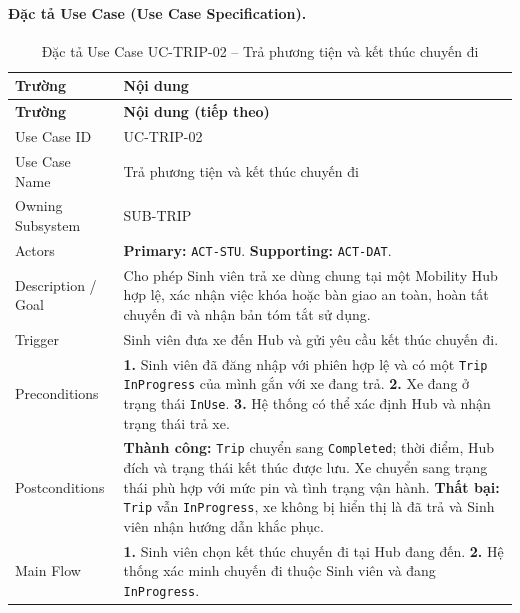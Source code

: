 \paragraph{Đặc tả Use Case (Use Case Specification).}
\small
\begin{longtable}{|L{42mm}|L{102mm}|}
  \caption{Đặc tả Use Case UC-TRIP-02 -- Trả phương tiện và kết thúc chuyến đi}\label{tab:spec-UC-TRIP-02}\\
  \hline
  \centering\arraybackslash\textbf{Trường} & \centering\arraybackslash\textbf{Nội dung}\\
  \hline
  \endfirsthead
  \hline
  \centering\arraybackslash\textbf{Trường} & \centering\arraybackslash\textbf{Nội dung (tiếp theo)}\\
  \hline
  \endhead
  Use Case ID & UC-TRIP-02\\\hline
  Use Case Name & Trả phương tiện và kết thúc chuyến đi\\\hline
  Owning Subsystem & SUB-TRIP\\\hline
  Actors & \textbf{Primary:} \texttt{ACT-STU}. \textbf{Supporting:} \texttt{ACT-DAT}.\\\hline
  Description / Goal & Cho phép Sinh viên trả xe dùng chung tại một Mobility Hub hợp lệ, xác nhận việc khóa hoặc bàn giao an toàn, hoàn tất chuyến đi và nhận bản tóm tắt sử dụng.\\\hline
  Trigger & Sinh viên đưa xe đến Hub và gửi yêu cầu kết thúc chuyến đi.\\\hline
  Preconditions &
    \textbf{1.} Sinh viên đã đăng nhập với phiên hợp lệ và có một \texttt{Trip} \texttt{InProgress} của mình gắn với xe đang trả.\newline
    \textbf{2.} Xe đang ở trạng thái \texttt{InUse}.\newline
    \textbf{3.} Hệ thống có thể xác định Hub và nhận trạng thái trả xe.\\\hline
  Postconditions &
    \textbf{Thành công:} \texttt{Trip} chuyển sang \texttt{Completed}; thời điểm, Hub đích và trạng thái kết thúc được lưu. Xe chuyển sang trạng thái phù hợp với mức pin và tình trạng vận hành.\newline
    \textbf{Thất bại:} \texttt{Trip} vẫn \texttt{InProgress}, xe không bị hiển thị là đã trả và Sinh viên nhận hướng dẫn khắc phục.\\\hline
  Main Flow &
    \textbf{1.} Sinh viên chọn kết thúc chuyến đi tại Hub đang đến.\newline
    \textbf{2.} Hệ thống xác minh chuyến đi thuộc Sinh viên và đang \texttt{InProgress}.\newline

\end{longtable}
